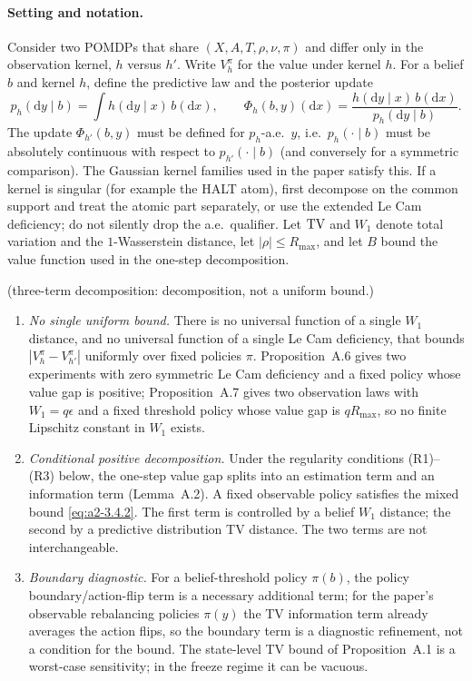 \paragraph{Setting and notation.}
Consider two POMDPs that share $(X,A,T,\rho,\nu,\pi)$ and differ only in the
observation kernel, $h$ versus $h'$.  Write $V_h^\pi$ for the value under
kernel $h$.  For a belief $b$ and kernel $h$, define the predictive law and the
posterior update
\[
p_h(\mathrm{d}y\mid b)=\int h(\mathrm{d}y\mid x)\,b(\mathrm{d}x),
\qquad
\Phi_h(b,y)(\mathrm{d}x)
=\frac{h(\mathrm{d}y\mid x)\,b(\mathrm{d}x)}{p_h(\mathrm{d}y\mid b)}.
\]
The update $\Phi_{h'}(b,y)$ must be defined for $p_h$-a.e.\ $y$, i.e.\
$p_h(\cdot\mid b)$ must be absolutely continuous with respect to
$p_{h'}(\cdot\mid b)$ (and conversely for a symmetric comparison).  The Gaussian
kernel families used in the paper satisfy this.  If a kernel is singular (for
example the HALT atom), first decompose on the common support and treat the
atomic part separately, or use the extended Le Cam deficiency; do not silently
drop the a.e.\ qualifier.  Let $\mathrm{TV}$ and $W_1$ denote total variation and the
$1$-Wasserstein distance, let $|\rho|\le R_{\max}$, and let $B$ bound the value
function used in the one-step decomposition.

\begin{aIIPropMain}
(three-term decomposition: decomposition, not a uniform bound.)
\begin{enumerate}
\item[(a)] \emph{No single uniform bound.}  There is no universal function of a
single $W_1$ distance, and no universal function of a single Le Cam
deficiency, that bounds
$|V_h^\pi-V_{h'}^\pi|$ uniformly over fixed policies $\pi$.  Proposition~A.6
gives two experiments with zero symmetric Le Cam deficiency and a fixed policy
whose value gap is positive; Proposition~A.7 gives two observation laws with
$W_1=q\epsilon$ and a fixed threshold policy whose value gap is $qR_{\max}$, so
no finite Lipschitz constant in $W_1$ exists.
\item[(b)] \emph{Conditional positive decomposition.}  Under the regularity
conditions (R1)--(R3) below, the one-step value gap splits into an estimation
term and an information term (Lemma~A.2).  A fixed observable policy
satisfies the mixed bound \eqref{eq:a2-3.4.2}.  The
first term is controlled by a belief $W_1$ distance; the second by a predictive
distribution TV distance.  The two terms are not interchangeable.
\item[(c)] \emph{Boundary diagnostic.}  For a belief-threshold policy
$\pi(b)$, the policy boundary/action-flip term is a necessary additional term;
for the paper's observable rebalancing policies $\pi(y)$
the TV information term already averages the action flips, so the boundary term
is a diagnostic refinement, not a condition for the bound.  The state-level TV
bound of Proposition~A.1 is a worst-case sensitivity; in the freeze regime it
can be vacuous.
\end{enumerate}
\end{aIIPropMain}

